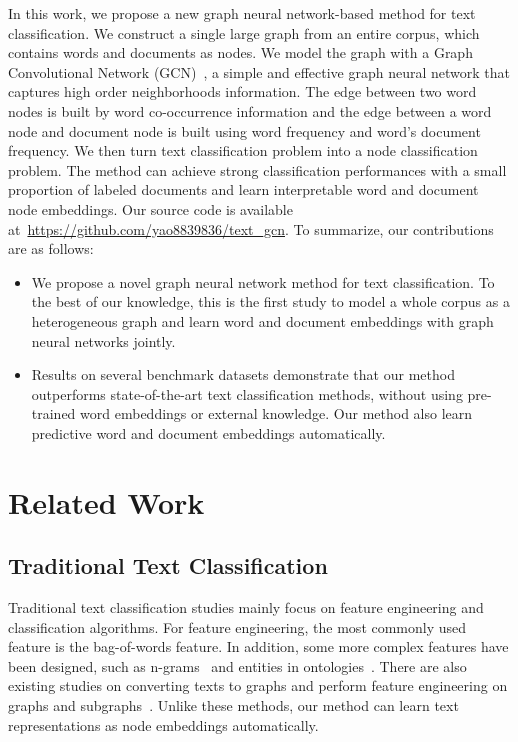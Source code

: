 \documentclass[letterpaper]{article} \usepackage{aaai19}  \usepackage{times}  \usepackage{helvet}  \usepackage{courier}  \usepackage{url}  \usepackage{graphicx}  \frenchspacing  \usepackage{amsmath}
\begin{document}
In this work, we propose a new graph neural network-based method for text classification. We construct a single large graph from an entire corpus, which contains words and documents as nodes. We model the graph with a Graph Convolutional Network (GCN)~\cite{kipf2017semi}, a simple and effective graph neural network that captures high order neighborhoods information. The edge between two word nodes is built by word co-occurrence information and the edge between a word node and document node is built using word frequency and word's document frequency. We then turn text classification problem into a node classification problem. The method can achieve strong classification performances with a small proportion of labeled documents and learn interpretable word and document node embeddings. Our source code is available at~\url{https://github.com/yao8839836/text_gcn}. To summarize, our contributions are as follows:
\begin{itemize}
\setlength\itemsep{0em}
\item We propose a novel graph neural network method for text classification. To the best of our knowledge, this is the first study to model a whole corpus as a heterogeneous graph and learn word and document embeddings with graph neural networks jointly. 
\item Results on several benchmark datasets demonstrate that our method outperforms state-of-the-art text classification methods, without using pre-trained word embeddings or external knowledge. Our method also learn predictive word and document embeddings automatically.
\end{itemize}

\section{Related Work}
\subsection{Traditional Text Classification}
Traditional text classification studies mainly focus on feature engineering and classification algorithms. For feature engineering, the most commonly used feature is the bag-of-words feature. In addition, some more complex features have been designed, such as n-grams~\cite{wang2012baselines} and entities in ontologies~\cite{chenthamarakshan2011concept}. There are also existing studies on converting texts to graphs and perform feature engineering on graphs and subgraphs~\cite{luo2016bridging,rousseau2015text,skianis2016regularizing,luo2014automatic,luo2015subgraph}.  Unlike these methods, our method can learn text representations as node embeddings automatically.
\end{document}
